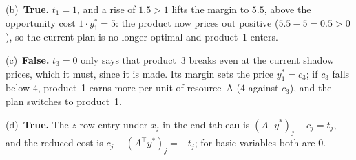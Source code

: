 \begin{solutions}
        (b)~\textbf{True.} $t_{1}=1$, and a rise of $1.5>1$ lifts the
        margin to $5.5$, above the opportunity cost $1\cdot y_{1}^{*}=5$:
        the product now prices out positive ($5.5-5=0.5>0$), so the
        current plan is no longer optimal and product~1 enters.

        (c)~\textbf{False.} $t_{3}=0$ only says that product~3 breaks even
        at the current shadow prices, which it must, since it is made. Its
        margin sets the price $y_{1}^{*}=c_{3}$; if $c_{3}$ falls below
        $4$, product~1 earns more per unit of resource~A ($4$ against
        $c_{3}$), and the plan switches to product~1.

        (d)~\textbf{True.} The $z$-row entry under $x_{j}$ in the end
        tableau is $(A^{\top}y^{*})_{j}-c_{j}=t_{j}$, and the reduced cost
        is $c_{j}-(A^{\top}y^{*})_{j}=-t_{j}$; for basic variables both
        are $0$.
\end{solutions}

